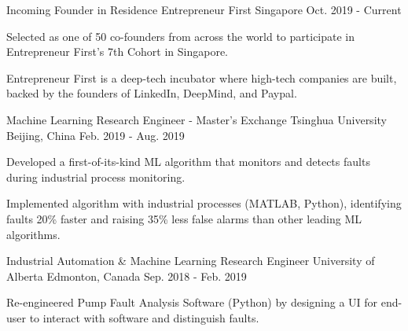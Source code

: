 

\begin{cventries}


\cventry
{Incoming Founder in Residence} %
{Entrepreneur First} %
{Singapore} %
{Oct. 2019 - Current} %
{
	\begin{cvitems} %
        \item {Selected as one of 50 co-founders from across the world to participate in Entrepreneur First's 7th Cohort in Singapore.}  
		\item {Entrepreneur First is a deep-tech incubator where high-tech companies are built, backed by the founders of LinkedIn, DeepMind, and Paypal.}    
	\end{cvitems}
}

\cventry
{Machine Learning Research Engineer - Master's Exchange} %
{Tsinghua University} %
{Beijing, China} %
{Feb. 2019 - Aug. 2019} %
{
	\begin{cvitems} %
        \item{Developed a first-of-its-kind ML algorithm that monitors and detects faults during industrial process monitoring.}
		\item {Implemented algorithm with industrial processes (MATLAB, Python), identifying faults 20\% faster and raising 35\% less false alarms than other leading ML algorithms.}
	\end{cvitems}
}

\cventry
{Industrial Automation \& Machine Learning Research Engineer} %
{University of Alberta} %
{Edmonton, Canada} %
{Sep. 2018 - Feb. 2019} %
{
	\begin{cvitems} %
		\item {Re-engineered Pump Fault Analysis Software (Python) by designing a UI for end-user to interact with software and distinguish faults.}   
	\end{cvitems}
}


\end{cventries}
